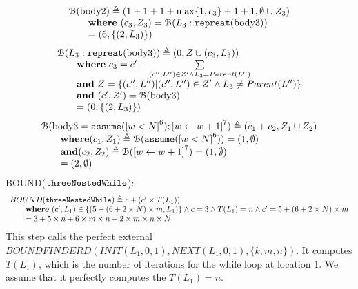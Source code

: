 \begin{enumerate}
\[
  \begin{array}{l}
    \mathcal{B}(\text{body2} )  \triangleq (1 + 1 + 1 + \max\{1, c_3\} + 1 + 1, \emptyset \cup Z_3) 
    \\ \qquad  
    \textbf{where} ~  (c_3, Z_3) = \mathcal{B}(L_3 : \mathtt{repreat}(\text{body3}))
    \\ \qquad = (6, \{( 2, L_3)\})
\end{array}
\]
\[
  \begin{array}{l}
    \mathcal{B}(L_3 : \mathtt{repreat}(\text{body3}))  
    \triangleq (0, Z \cup (c_3, L_3)) 
    \\ \qquad
    \textbf{where} ~ c_3 = c' + \sum\limits_{(c'', L'') \in Z' \land L_3 = Parent(L'')}
    \\ \qquad
    \textbf{and} ~
    Z = \{(c'', L'') | (c'', L'') \in Z' \land L_3 \neq Parent(L'')\}
    \\
    \qquad
    \textbf{and} ~ (c', Z') = \mathcal{B}(\text{body3})
    \\ \qquad = (0, \{(2, L_3)\})
\end{array}
\]
\[
  \begin{array}{l}
    \BD(\text{body3} = \rpasum(\clabel{w < N}^{6}); \clabel{\assign{w}{w + 1}}^{7})
    \triangleq (c_1 + c_2, Z_1 \cup Z_2 ) 
    \\ \qquad
    \textbf{where} (c_1, Z_1) \triangleq  \BD( \rpasum(\clabel{w < N}^{6})) =  (1, \emptyset)
    \\ \qquad
    \textbf{and} (c_2, Z_2) \triangleq  \BD(\clabel{\assign{w}{w + 1}}^{7})  = (1, \emptyset)
    \\ \qquad = (2, \emptyset)
\end{array}
\]
BOUND($\mathtt{threeNestedWhile}$):
\[
  \begin{array}{l}
    BOUND(\mathtt{threeNestedWhile})
    \triangleq c + (c' \times T(L_1))
    \\ \qquad  \textbf{where} ~
    (c', L_1) \in \{(5 + (6 + 2 \times N) \times m, L_1)\}
    \land c = 3 \land 
    T(L_1) = n \land c' = 5 + (6 + 2 \times N) \times m
    \\ \qquad = 3 + 5 \times n + 6 \times m \times n + 2 \times m \times n \times N
\end{array}
\]
This step calls the perfect external
\\
$BOUNDFINDERD(INIT(L_1, 0, 1), NEXT(L_1, 0, 1), \{k, m, n\})$.
It computes $T(L_1)$, which is the number of iterations for the while loop at location $1$.
We assume that it perfectly computes the $T(L_1) = n$.
\end{enumerate}
